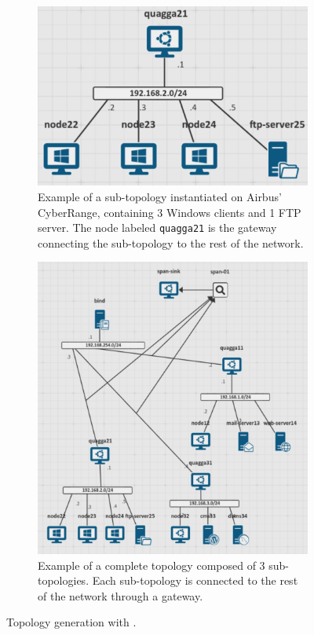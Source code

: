 \begin{figure}
  \centering
  \begin{subfigure}[b]{0.49\linewidth}
    \centering
    \includegraphics[width=\linewidth]{figures/sub_topology.png}
    \caption{
      Example of a sub-topology instantiated on Airbus' CyberRange, containing 3 Windows clients and 1 FTP server.
      The node labeled \texttt{quagga21} is the gateway connecting the sub-topology to the rest of the network.
      \label{fig:topologies.example}
    }
  \end{subfigure}
  \hfill
  \begin{subfigure}[b]{0.49\linewidth}
    \centering
    \includegraphics[width=\linewidth]{figures/topology.png}
    \caption{
      Example of a complete topology composed of 3 sub-topologies.
      Each sub-topology is connected to the rest of the network through a gateway.
      \label{fig:topologies.topology}
    }
  \end{subfigure}
  \caption{
    Topology generation with \thecontrib.
  }
\end{figure}


